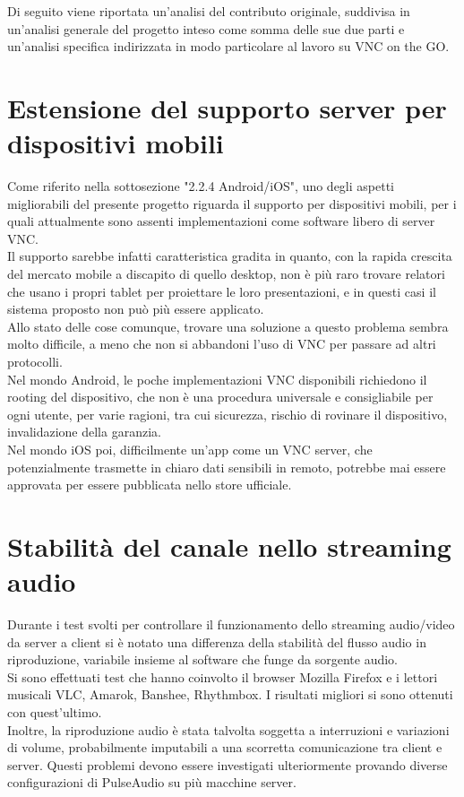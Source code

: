Di seguito viene riportata un'analisi del contributo originale, suddivisa in un'analisi generale del progetto inteso come somma delle sue due parti e un'analisi specifica indirizzata in modo particolare al lavoro su VNC on the GO.
\section{Estensione del supporto server per dispositivi mobili}
Come riferito nella sottosezione "2.2.4 Android/iOS", uno degli aspetti migliorabili del presente progetto riguarda il supporto per dispositivi mobili, per i quali attualmente sono assenti implementazioni come software libero di server VNC.\\
Il supporto sarebbe infatti caratteristica gradita in quanto, con la rapida crescita del mercato mobile a discapito di quello desktop, non è più raro trovare relatori che usano i propri tablet per proiettare le loro presentazioni, e in questi casi il sistema proposto non può più essere applicato.\\
Allo stato delle cose comunque, trovare una soluzione a questo problema sembra molto difficile, a meno che non si abbandoni l'uso di VNC per passare ad altri protocolli. \\
Nel mondo Android, le poche implementazioni VNC disponibili richiedono il rooting del dispositivo, che non è una procedura universale e consigliabile per ogni utente, per varie ragioni, tra cui sicurezza, rischio di rovinare il dispositivo, invalidazione della garanzia.\\
Nel mondo iOS poi, difficilmente un'app come un VNC server, che potenzialmente trasmette in chiaro dati sensibili in remoto, potrebbe mai essere approvata per essere pubblicata nello store ufficiale.
\section{Stabilità del canale nello streaming audio}
Durante i test svolti per controllare il funzionamento dello streaming audio/video da server a client si è notato una differenza della stabilità del flusso audio in riproduzione, variabile insieme al software che funge da sorgente audio.\\
Si sono effettuati test che hanno coinvolto il browser Mozilla Firefox e i lettori musicali VLC, Amarok, Banshee, Rhythmbox. I risultati migliori si sono ottenuti con quest'ultimo.\\
Inoltre, la riproduzione audio è stata talvolta soggetta a interruzioni e variazioni di volume, probabilmente imputabili a una scorretta comunicazione tra client e server. Questi problemi devono essere investigati ulteriormente provando diverse configurazioni di PulseAudio su più macchine server.

